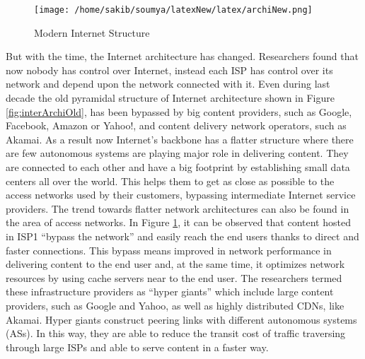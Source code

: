 \begin{figure}[htb]
  \centering
  \texttt{[image: /home/sakib/soumya/latexNew/latex/archiNew.png]}\\
  \caption{Modern Internet Structure}
  \label{fig:interArchiNew}
\end{figure}

\clearpage

\noindent But with the time, the Internet architecture has changed. Researchers found that now nobody has control over Internet, instead each ISP has control over its network and depend upon the network connected with it. Even during last decade the old pyramidal structure of Internet architecture shown in Figure \ref{fig:interArchiOld}, has been bypassed by big content providers, such as Google, Facebook, Amazon or Yahoo!, and content delivery network operators, such as Akamai. As a result now Internet's backbone has a flatter structure where there are few autonomous systems are playing major role in delivering content. They are connected to each other and have a big footprint by establishing small data centers all over the world. This helps them to get as close as possible to the access networks used by their customers, bypassing intermediate Internet service providers. The trend towards flatter network architectures can also be found in the area of access networks. In Figure \ref{fig:interArchiNew}, it can be observed that content hosted in ISP1 “bypass the network” and easily reach the end users thanks to direct and faster connections. This bypass means improved in network performance in delivering content to the end user and, at the same time,  it optimizes network resources by using cache servers near to the end user. The researchers termed these infrastructure providers as “hyper giants” which include large content providers, such as Google and Yahoo, as well as highly distributed CDNs, like Akamai. Hyper giants construct peering links with different autonomous systems (ASs). In this way, they are able to reduce the transit cost of traffic traversing through large ISPs and able to serve content in a faster way.

